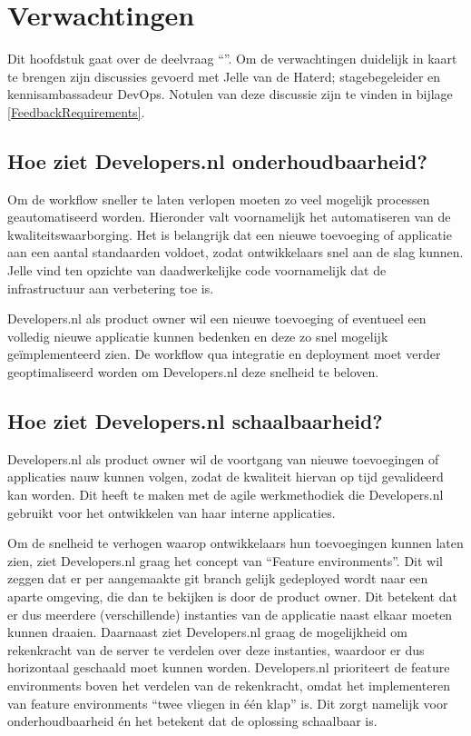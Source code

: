 \chapter{Verwachtingen}

\label{Verwachtingen}

Dit hoofdstuk gaat over de deelvraag \enquote{\deelverwachtingen}. Om de verwachtingen duidelijk in kaart te brengen zijn discussies gevoerd met Jelle van de Haterd; stagebegeleider en kennisambassadeur DevOps. Notulen van deze discussie zijn te vinden in bijlage \ref{FeedbackRequirements}.

\section{Hoe ziet Developers.nl onderhoudbaarheid?}

Om de workflow sneller te laten verlopen moeten zo veel mogelijk processen geautomatiseerd worden. Hieronder valt voornamelijk het automatiseren van de kwaliteitswaarborging. Het is belangrijk dat een nieuwe toevoeging of applicatie aan een aantal standaarden voldoet, zodat ontwikkelaars snel aan de slag kunnen. Jelle vind ten opzichte van daadwerkelijke code voornamelijk dat de infrastructuur aan verbetering toe is.

Developers.nl als product owner wil een nieuwe toevoeging of eventueel een volledig nieuwe applicatie kunnen bedenken en deze zo snel mogelijk geïmplementeerd zien. De workflow qua integratie en deployment moet verder geoptimaliseerd worden om Developers.nl deze snelheid te beloven.

\section{Hoe ziet Developers.nl schaalbaarheid?}

Developers.nl als product owner wil de voortgang van nieuwe toevoegingen of applicaties nauw kunnen volgen, zodat de kwaliteit hiervan op tijd gevalideerd kan worden. Dit heeft te maken met de agile werkmethodiek die Developers.nl gebruikt voor het ontwikkelen van haar interne applicaties.

Om de snelheid te verhogen waarop ontwikkelaars hun toevoegingen kunnen laten zien, ziet Developers.nl graag het concept van \enquote{Feature environments}. Dit wil zeggen dat er per aangemaakte git branch gelijk gedeployed wordt naar een aparte omgeving, die dan te bekijken is door de product owner. Dit betekent dat er dus meerdere (verschillende) instanties van de applicatie naast elkaar moeten kunnen draaien. Daarnaast ziet Developers.nl graag de mogelijkheid om rekenkracht van de server te verdelen over deze instanties, waardoor er dus horizontaal geschaald moet kunnen worden. Developers.nl prioriteert de feature environments boven het verdelen van de rekenkracht, omdat het implementeren van feature environments \enquote{twee vliegen in één klap} is. Dit zorgt namelijk voor onderhoudbaarheid én het betekent dat de oplossing schaalbaar is.

